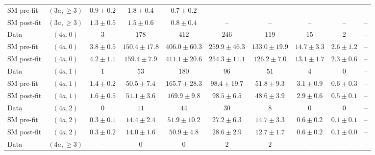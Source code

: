 \begin{table}[h!]
{\begin{tabular}{lccccccccc}
SM pre-fit  & $(3a,\geq 3)$      & $0.9\pm0.2$      & $1.8\pm0.4$      & $0.7\pm0.2$    & --             & --             & --           & --           & --           \\[0.5ex]
SM post-fit & $(3a,\geq 3)$      & $1.3\pm0.5$      & $1.5\pm0.6$      & $0.8\pm0.4$    & --             & --             & --           & --           & --           \\[0.5ex]
Data        & $(4a,0)$           & $3$              & $178$            & $412$          & $246$          & $119$          & $15$         & $2$          & --           \\[0.5ex]
SM pre-fit  & $(4a,0)$           & $3.8\pm0.5$      & $150.4\pm17.8$   & $406.0\pm60.3$ & $259.9\pm46.3$ & $133.0\pm19.9$ & $14.7\pm3.3$ & $2.6\pm1.2$  & --           \\[0.5ex]
SM post-fit & $(4a,0)$           & $4.2\pm1.1$      & $159.4\pm7.9$    & $411.1\pm20.6$ & $254.3\pm11.1$ & $126.2\pm7.0$  & $13.1\pm1.7$ & $2.3\pm0.6$  & --           \\[0.5ex]
Data        & $(4a,1)$           & $1$              & $53$             & $180$          & $96$           & $51$           & $4$          & $0$          & --           \\[0.5ex]
SM pre-fit  & $(4a,1)$           & $1.4\pm0.2$      & $50.5\pm7.4$     & $165.7\pm28.3$ & $98.4\pm19.7$  & $51.8\pm9.3$   & $3.1\pm0.9$  & $0.6\pm0.3$  & --           \\[0.5ex]
SM post-fit & $(4a,1)$           & $1.6\pm0.5$      & $51.1\pm3.6$     & $169.9\pm9.8$  & $98.5\pm6.5$   & $48.6\pm3.9$   & $2.9\pm0.6$  & $0.5\pm0.1$  & --           \\[0.5ex]
Data        & $(4a,2)$           & $0$              & $11$             & $44$           & $30$           & $8$            & $0$          & $0$          & --           \\[0.5ex]
SM pre-fit  & $(4a,2)$           & $0.3\pm0.1$      & $14.4\pm2.4$     & $51.9\pm10.2$  & $27.2\pm6.3$   & $14.7\pm3.3$   & $0.6\pm0.2$  & $0.1\pm0.1$  & --           \\[0.5ex]
SM post-fit & $(4a,2)$           & $0.3\pm0.2$      & $14.0\pm1.6$     & $50.9\pm4.8$   & $28.6\pm2.9$   & $12.7\pm1.7$   & $0.6\pm0.2$  & $0.1\pm0.0$  & --           \\[0.5ex]
Data        & $(4a,\geq 3)$      & --               & $0$              & $0$            & $2$            & $2$            & --           & --           & --           \\[0.5ex]

\end{tabular}}
\end{table}
